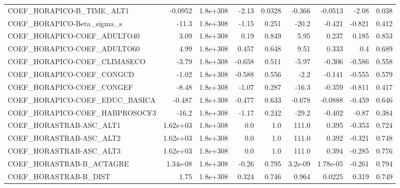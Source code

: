 \begin{tabular}{lrrrrrrrr}
COEF\_HORAPICO-B\_TIME\_ALT1         &     -0.0952 &     1.8e+308 &   -2.13 &   0.0328 &     -0.366 &     -0.0513 &        -2.08 &         0.038 \\
COEF\_HORAPICO-Beta\_sigma\_s        &       -11.3 &     1.8e+308 &   -1.15 &    0.251 &      -20.2 &      -0.421 &       -0.821 &         0.412 \\
COEF\_HORAPICO-COEF\_ADULTO40       &        3.09 &     1.8e+308 &    0.19 &    0.849 &       5.95 &       0.237 &        0.185 &         0.853 \\
COEF\_HORAPICO-COEF\_ADULTO60       &        4.99 &     1.8e+308 &   0.457 &    0.648 &       9.51 &       0.333 &          0.4 &         0.689 \\
COEF\_HORAPICO-COEF\_CLIMASECO      &       -3.79 &     1.8e+308 &  -0.658 &    0.511 &      -5.97 &      -0.306 &       -0.586 &         0.558 \\
COEF\_HORAPICO-COEF\_CONGCD         &       -1.02 &     1.8e+308 &  -0.588 &    0.556 &       -2.2 &      -0.141 &       -0.555 &         0.579 \\
COEF\_HORAPICO-COEF\_CONGEF         &       -8.48 &     1.8e+308 &   -1.07 &    0.287 &      -16.3 &      -0.359 &       -0.811 &         0.417 \\
COEF\_HORAPICO-COEF\_EDUC\_BASICA    &      -0.487 &     1.8e+308 &  -0.477 &    0.633 &     -0.678 &     -0.0888 &       -0.459 &         0.646 \\
COEF\_HORAPICO-COEF\_HABPROSOCF3    &       -16.2 &     1.8e+308 &   -1.17 &    0.242 &      -29.2 &      -0.402 &        -0.87 &         0.384 \\
COEF\_HORASTRAB-ASC\_ALT1           &    1.62e+03 &     1.8e+308 &     0.0 &      1.0 &      111.0 &       0.395 &       -0.353 &         0.724 \\
COEF\_HORASTRAB-ASC\_ALT2           &    1.62e+03 &     1.8e+308 &     0.0 &      1.0 &      111.0 &       0.392 &       -0.321 &         0.748 \\
COEF\_HORASTRAB-ASC\_ALT3           &    1.62e+03 &     1.8e+308 &     0.0 &      1.0 &      111.0 &       0.394 &       -0.285 &         0.776 \\
COEF\_HORASTRAB-B\_ACTAGRE          &    1.34e-08 &     1.8e+308 &   -0.26 &    0.795 &    3.2e-09 &    1.78e-05 &       -0.261 &         0.794 \\
COEF\_HORASTRAB-B\_DIST             &        1.75 &     1.8e+308 &   0.324 &    0.746 &      0.964 &      0.0225 &        0.319 &         0.749 \\

\end{tabular}
